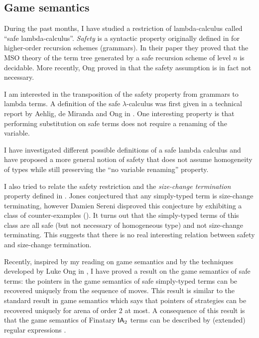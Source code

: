 \subsection{Game semantics}

During the past months, I have studied a restriction of
lambda-calculus called ``safe lambda-calculus''. \emph{Safety} is a
syntactic property originally defined in \cite{KNU02} for
higher-order recursion schemes (grammars). In their paper they
proved that the MSO theory of the term tree generated by a safe
recursion scheme of level $n$ is decidable. More recently, Ong
proved in \cite{OngLics2006} that the safety assumption is in fact
not necessary.

I am interested in the transposition of the safety property from
grammars to lambda terms. A definition of the safe
$\lambda$-calculus was first given in a technical report by Aehlig,
de Miranda and Ong in \cite{safety-mirlong2004}. One interesting
property is that performing substitution on safe terms does not
require a renaming of the variable.

I have investigated different possible definitions of a safe lambda
calculus and have proposed a more general notion of safety that does
not assume homogeneity of types while still preserving  the ``no
variable renaming'' property.

I also tried to relate the safety restriction and the
\emph{size-change termination} property defined in
\cite{jones01,jones04}. Jones conjectured that any simply-typed term
is size-change terminating, however Damien Sereni disproved this
conjecture by exhibiting a class of counter-examples
(\cite{serenistypesct05}). It turns out that the simply-typed terms
of this class are all safe (but not necessary of homogeneous type)
and not size-change terminating. This suggests that there is no real
interesting relation between safety and size-change termination.


Recently, inspired by my reading on game semantics
\citep{abramsky:game-semantics-tutorial} and by the techniques
developed by Luke Ong in \citep{OngLics2006}, I have proved a result
on the game semantics of safe terms: the pointers in the game
semantics of safe simply-typed terms can be recovered uniquely from
the sequence of moves. This result is similar to the standard result
in game semantics which says that pointers of strategies can be
recovered uniquely for arena of order 2 at most. A consequence of
this result is that the game semantics of Finatary $\textsf{IA}_2$ terms
can be described by (extended) regular expressions
\cite{ghicamccusker00}.


